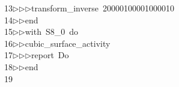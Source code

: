 \begin{tabbing}
13\>$\triangleright$\>$\triangleright$\>$\triangleright$\>transform\_inverse\ 20000100001000010\ \\[0pt]
14\>$\triangleright$\>$\triangleright$\>end\ \\[0pt]
15\>$\triangleright$\>$\triangleright$\>with\ S8\_0\ do\ \\[0pt]
16\>$\triangleright$\>$\triangleright$\>cubic\_surface\_activity\ \\[0pt]
17\>$\triangleright$\>$\triangleright$\>$\triangleright$\>report\ Do\ \\[0pt]
18\>$\triangleright$\>$\triangleright$\>end\\[0pt]
19\>\end{tabbing}
